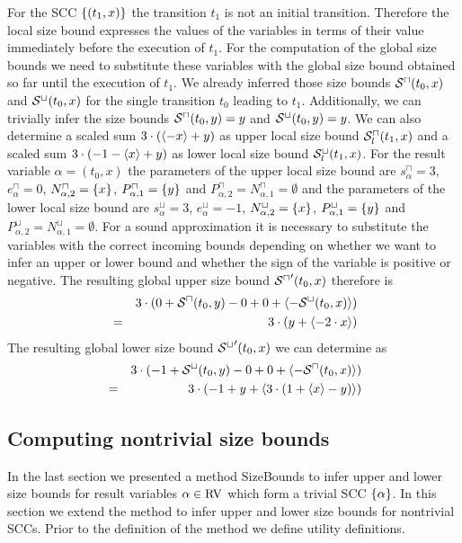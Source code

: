 For the SCC $\lbrace (t_1,x) \rbrace$ the transition $t_1$ is not an initial transition.
Therefore the local size bound expresses the values of the variables in terms of their value immediately before the execution of $t_1$.
For the computation of the global size bounds we need to substitute these variables with the global size bound obtained so far until the execution of $t_1$.
We already inferred those size bounds ${\mathcal{S}^\sqcap}(t_0,x)$ and ${\mathcal{S}^\sqcup}(t_0,x)$ for the single transition $t_0$ leading to $t_1$.
Additionally, we can trivially infer the size bounds ${\mathcal{S}^\sqcap}(t_0,y) = y$ and ${\mathcal{S}^\sqcup}(t_0,y) = y$.
We can also determine a scaled sum $3 \cdot (\langle-x\rangle + y)$ as upper local size bound ${\mathcal{S}^\sqcap_l}(t_1,x)$ and a scaled sum $3 \cdot (-1 - \langle x\rangle + y)$ as lower local size bound ${\mathcal{S}^\sqcup_l}(t_1,x)$.
For the result variable $\alpha = (t_0,x)$ the parameters of the upper local size bound are $s^\sqcap_\alpha = 3$, $e^\sqcap_\alpha = 0$, $N^\sqcap_{\alpha,2} = \lbrace x \rbrace$, $P^\sqcap_{\alpha,1} = \lbrace y \rbrace$ and $P^\sqcap_{\alpha,2} = N^\sqcap_{\alpha,1} = \emptyset$ and the parameters of the lower local size bound are $s^\sqcup_\alpha = 3$, $e^\sqcup_\alpha = -1$, $N^\sqcup_{\alpha,2} = \lbrace x \rbrace$, $P^\sqcup_{\alpha,1} = \lbrace y \rbrace$ and $P^\sqcup_{\alpha,2} = N^\sqcup_{\alpha,1} = \emptyset$.
For a sound approximation it is necessary to substitute the variables with the correct incoming bounds depending on whether we want to infer an upper or lower bound and whether the sign of the variable is positive or negative.
The resulting global upper size bound ${\mathcal{S}^\sqcap}'(t_0,x)$ therefore is 
\begin{align*}
  && 3 \cdot ( 0 + {\mathcal{S}^\sqcap}(t_0, y) - 0 + 0 + \langle-{\mathcal{S}^\sqcup}(t_0, x)\rangle ) \\
  & = & 3 \cdot ( y + \langle-2 \cdot x\rangle )
\end{align*}
The resulting global lower size bound ${\mathcal{S}^\sqcup}'(t_0,x)$ we can determine as
\begin{align*}
  && 3 \cdot ( -1 + {\mathcal{S}^\sqcup}(t_0, y) - 0 + 0 + \langle-{\mathcal{S}^\sqcap}(t_0, x)\rangle ) \\
  & = & 3 \cdot ( -1 + y + \langle3 \cdot (1 + \langle x\rangle - y)\rangle )
\end{align*}


\subsection{Computing nontrivial size bounds}

In the last section we presented a method SizeBounds to infer upper and lower size bounds for result variables $\alpha \in \text{RV}$ which form a trivial SCC $\lbrace \alpha \rbrace$.
In this section we extend the method to infer upper and lower size bounds for nontrivial SCCs.
Prior to the definition of the method we define utility definitions.

